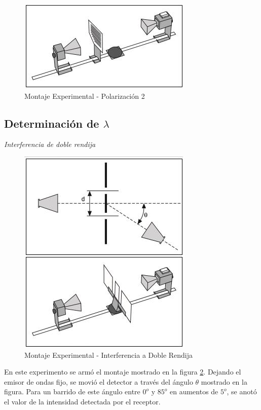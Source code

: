 \documentclass[%
 reprint,
 amsmath,amssymb,
 aps,
]{revtex4-1}
\begin{document}
\begin{figure}[h!]
\centering
\includegraphics[width=0.7\linewidth]{Pictures/polarizacion}
\caption{Montaje Experimental - Polarización 2}
\label{fig:polarizacion}
\end{figure}

\subsection{\label{sec:level2}Determinación de $ \lambda $}
\textit{Interferencia de doble rendija} \\

\begin{figure}[h!]
\centering
\includegraphics[width=0.7\linewidth]{Pictures/Interferencia}
\caption{Montaje Experimental - Interferencia a Doble Rendija}
\label{fig:Interferencia}
\end{figure}

En este experimento se armó el montaje mostrado en la figura \ref{fig:Interferencia}. Dejando el emisor de ondas fijo, se movió el detector a través del ángulo $ \theta $ mostrado en la figura. Para un barrido de este ángulo entre $0^o$ y $85^o$ en aumentos de $5^o$, se anotó el valor de la intensidad detectada por el receptor. \\
\end{document}
